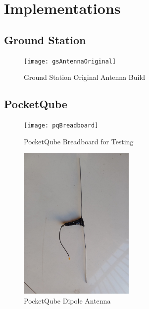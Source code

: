 \chapter{Implementations}
\section{Ground Station}\label{sec:appendix_gs_antenna_original}
\begin{figure}[!htb]
  \centering
  \texttt{[image: gsAntennaOriginal]}
  \caption{Ground Station Original Antenna Build}
  \label{fig:gsAntennaOriginal}
\end{figure}
\newpage
\section{PocketQube}\label{sec:appendix_pq}
\begin{figure}[!htb]
    \centering
    \texttt{[image: pqBreadboard]}
    \caption{PocketQube Breadboard for Testing}
    \label{fig:pqBreadboard}
\end{figure}
\begin{figure}[!htb]
  \centering
  \includegraphics[width=0.5\textwidth]{pqAntenna}
  \caption{PocketQube Dipole Antenna}
  \label{fig:pqAntenna}
\end{figure}
\newpage

